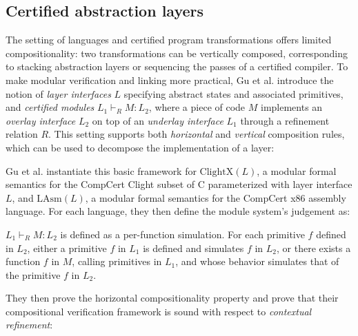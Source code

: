 \subsection{Certified abstraction layers}
The setting of languages and certified program transformations
offers limited compositionality:
two transformations can be vertically composed,
corresponding to stacking abstraction layers
or sequencing the passes of a certified compiler.
To make modular verification and linking more practical, Gu et
al. \cite{dscal15} introduce the notion of \emph{layer interfaces} $L$
specifying abstract states and associated primitives,
and \emph{certified modules} $L_1 \vdash_R M : L_2$,
where a piece of code $M$
implements an \emph{overlay interface} $L_2$ on top of an
\emph{underlay interface} $L_1$ through a refinement relation $R$.
This setting supports both \emph{horizontal} and \emph{vertical} composition rules,
which can be used to decompose the implementation of a layer:

\vspace{-5pt}
{\small
\begin{mathpar}
\end{mathpar}
\vspace{-5pt}
\begin{mathpar}
\end{mathpar}
\vspace{-5pt}
}%

Gu et al. instantiate this basic framework for
$\text{ClightX}(L)$, a modular formal semantics for the CompCert
Clight subset of C parameterized with layer interface $L$, and
$\text{LAsm}(L)$, a modular formal semantics for the CompCert x86
assembly language. For each language, they then define
the module system's judgement as:
\begin{definition} \label{def:popl15-layers}
$L_1 \vdash_R M : L_2$ is defined as a per-function simulation.
For
  each primitive $f$ defined in $L_2$, either a primitive $f$ in $L_1$
  is defined and simulates $f$ in $L_2$, or there exists a function
  $f$ in $M$, calling primitives in $L_1$, and whose behavior
  simulates that of the primitive $f$ in $L_2$.
\end{definition}
They then prove the horizontal compositionality
property
and prove that their compositional
verification framework is sound with respect to \emph{contextual
  refinement}:

